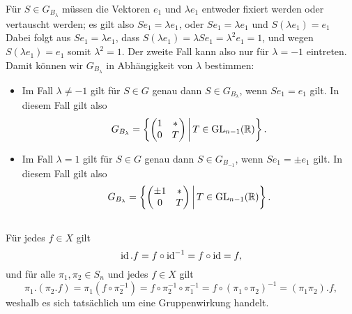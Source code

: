 \begin{itemize}
    Für $S \in G_{B_\lambda}$ müssen die Vektoren $e_1$ und $\lambda e_1$ entweder fixiert werden oder vertauscht werden; es gilt also $S e_1 = \lambda e_1$, oder $S e_1 = \lambda e_1$ und $S(\lambda e_1) = e_1$
    Dabei folgt aus $S e_1 = \lambda e_1$, dass $S(\lambda e_1) = \lambda S e_1 = \lambda^2 e_1 = 1$, und wegen $S(\lambda e_1) = e_1$ somit $\lambda^2 = 1$.
    Der zweite Fall kann also nur für $\lambda = -1$ eintreten.
    Damit können wir $G_{B_\lambda}$ in Abhängigkeit von $\lambda$ bestimmen:
    \begin{itemize}
      \item
        Im Fall $\lambda \neq -1$ gilt für $S \in G$ genau dann $S \in G_{B_\lambda}$, wenn $Se_1 = e_1$ gilt.
        In diesem Fall gilt also
        \[
            G_{B_\lambda}
          = \left\{
              \begin{pmatrix}
                1 & * \\
                0 & T
              \end{pmatrix}
            \suchthat*
              T \in \GL{n-1}{\Real}
            \right\}.
        \]
      \item
        Im Fall $\lambda = 1$ gilt für $S \in G$ genau dann $S \in G_{B_{-1}}$, wenn $S e_1 = \pm e_1$ gilt.
        In diesem Fall gilt also
        \[
            G_{B_\lambda}
          = \left\{
              \begin{pmatrix}
                \pm 1 & * \\
                    0 & T
              \end{pmatrix}
            \suchthat*
              T \in \GL{n-1}{\Real}
            \right\}.
        \]
    \end{itemize}
\end{itemize}





\addtocounter{subsection}{1}





\addtocounter{subsection}{1}





\subsection{}

Für jedes $f \in X$ gilt
\[
    \operatorname{id}.f
  = f \circ \operatorname{id}^{-1}
  = f \circ \operatorname{id}
  = f,
\]
und für alle $\pi_1, \pi_2 \in S_n$ und jedes $f \in X$ gilt
\[
    \pi_1.(\pi_2.f)
  = \pi_1(f \circ \pi_2^{-1})
  = f \circ \pi_2^{-1} \circ \pi_1^{-1}
  = f \circ (\pi_1 \circ \pi_2)^{-1}
  = (\pi_1 \pi_2).f,
\]
weshalb es sich tatsächlich um eine Gruppenwirkung handelt.

